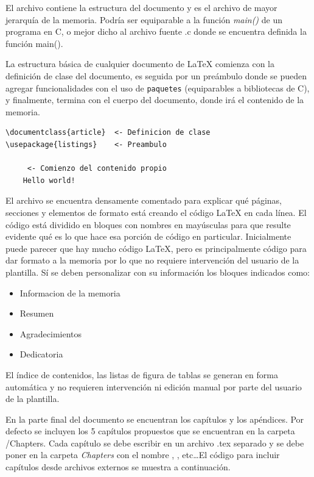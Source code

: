 El archivo  contiene la estructura del documento y es el
archivo de mayor jerarquía de la memoria. Podría ser equiparable a la función
\emph{main()} de un programa en C, o mejor dicho al archivo fuente .c donde se
encuentra definida la función main().

La estructura básica de cualquier documento de \LaTeX{} comienza con la
definición de clase del documento, es seguida por un preámbulo donde se pueden
agregar funcionalidades con el uso de \texttt{paquetes} (equiparables a
bibliotecas de C), y finalmente, termina con el cuerpo del documento, donde irá
el contenido de la memoria.


\begin{lstlisting}
\documentclass{article}  <- Definicion de clase
\usepackage{listings}	 <- Preambulo

	 <- Comienzo del contenido propio 
	Hello world!

\end{lstlisting}

El archivo  se encuentra densamente comentado para explicar
qué páginas, secciones y elementos de formato está creando el código \LaTeX{}
en cada línea. El código está dividido en bloques con nombres en mayúsculas
para que resulte evidente qué es lo que hace esa porción de código en
particular. Inicialmente puede parecer que hay mucho código \LaTeX{}, pero es
principalmente código para dar formato a la memoria por lo que no requiere
intervención del usuario de la plantilla. Sí se deben personalizar con su
información los bloques indicados como:

\begin{itemize}
      \item Informacion de la memoria
      \item Resumen
      \item Agradecimientos
      \item Dedicatoria
\end{itemize}

El índice de contenidos, las listas de figura de tablas se generan en forma
automática y no requieren intervención ni edición manual por parte del usuario
de la plantilla.

En la parte final del documento se encuentran los capítulos y los apéndices.
Por defecto se incluyen los 5 capítulos propuestos que se encuentran en la
carpeta /Chapters. Cada capítulo se debe escribir en un archivo .tex separado y
se debe poner en la carpeta \emph{Chapters} con el nombre ,
, etc\ldots El código para incluir capítulos desde archivos
externos se muestra a continuación.

